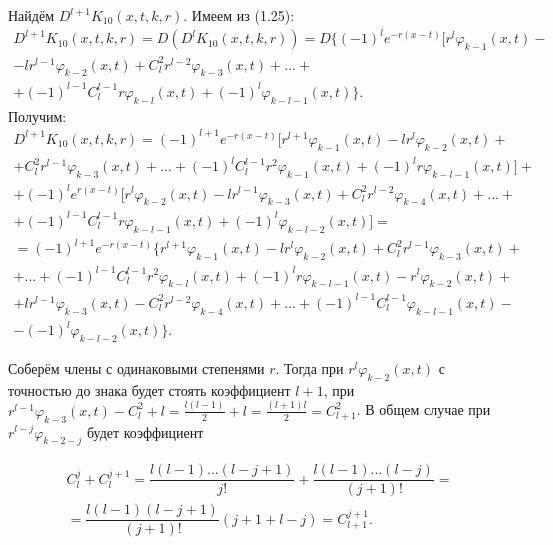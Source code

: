 Найдём $ D^{l+1}K_{10}(x,t,k,r) $. Имеем из (1.25):
\begin{equation}
\begin{array}{c}
\nonumber

D^{l+1}K_{10}(x,t,k,r) = D(D^lK_{10}(x,t,k,r)) = D\lbrace (-1)^le^{-r(x-t)}[r^l\varphi_{k-1}(x,t) - \\
- lr^{l-1}\varphi_{k-2}(x,t) + C_l^2r^{l-2}\varphi_{k-3}(x,t) + ... + \\ + (-1)^{l-1}C_l^{l-1}r\varphi_{k-l}(x,t) + (-1)^l\varphi_{k-l-1}(x,t)\rbrace .

\end{array}
\end{equation}
Получим:
\begin{equation}
\begin{array}{c}
\nonumber

D^{l+1}K_{10}(x,t,k,r) = (-1)^{l+1}e^{-r(x-t)}[r^{l+1}\varphi_{k-1}(x,t) - lr^l\varphi_{k-2}(x,t) + \\ + C_l^2r^{l-1}\varphi_{k-3}(x,t) + ... + (-1)^lC_l^{l-1}r^2\varphi_{k-1}(x,t) + (-1)^lr\varphi_{k-l-1}(x,t)] + \\ + (-1)^le^{r(x-t)}[r^l\varphi_{k-2}(x,t) - lr^{l-1}\varphi_{k-3}(x,t) + C_l^2r^{l-2}\varphi_{k-4}(x,t) + ... + \\ + (-1)^{l-1}C_l^{l-1}r\varphi_{k-l-1}(x,t) + (-1)^l\varphi_{k-l-2}(x,t)] = \\
= (-1)^{l+1}e^{-r(x-t)}\lbrace r^{l+1}\varphi_{k-1}(x,t) - lr^l\varphi_{k-2}(x,t) + C_l^2r^{l-1}\varphi_{k-3}(x,t) + \\ + ... + (-1)^{l-1}C_l^{l-1}r^2\varphi_{k-l}(x,t) + (-1)^lr\varphi_{k-l-1}(x,t) - r^l\varphi_{k-2}(x,t) + \\ + lr^{l-1}\varphi_{k-3}(x,t) - C_l^2r^{l-2}\varphi_{k-4}(x,t) + ... + (-1)^{l-1}C_l^{l-1}\varphi_{k-l-1}(x,t) - \\ - (-1)^l\varphi_{k-l-2}(x,t)\rbrace .

\end{array}
\end{equation}

Соберём члены с одинаковыми степенями $ r $. Тогда при $ r^l\varphi_{k-2}(x,t) $ с точностью до знака будет стоять коэффициент $ l + 1 $, при $ r^{l-1}\varphi_{k-3}(x,t) - C_l^2 + l = \frac{l(l-1)}{2} + l = \frac{(l+1)l}{2} = C_{l+1}^2$.
В общем случае при $ r^{l-j}\varphi_{k-2-j} $ будет коэффициент

\begin{equation}
\begin{array}{c}
\nonumber

C_l^j + C_l^{j+1} = \dfrac{l(l-1)...(l-j+1)}{j!} + \dfrac{l(l-1)...(l-j)}{(j+1)!} = \\
= \dfrac{l(l-1)(l-j+1)}{(j+1)!}(j+1+l-j) = C_{l+1}^{j+1}.

\end{array}
\end{equation}

